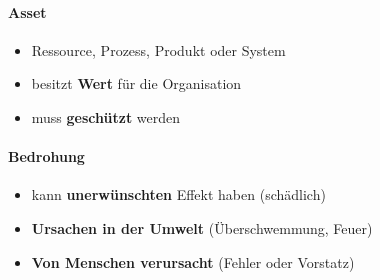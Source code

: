 \paragraph{Asset}
\begin{itemize}
	\item Ressource, Prozess, Produkt oder System
	\item besitzt \textbf{Wert} für die Organisation
	\item muss \textbf{geschützt} werden
\end{itemize}

\paragraph{Bedrohung}
\begin{itemize}
	\item kann \textbf{unerwünschten} Effekt haben (schädlich)
	\item \textbf{Ursachen in der Umwelt} (Überschwemmung, Feuer)
	\item \textbf{Von Menschen verursacht} (Fehler oder Vorstatz)
\end{itemize}
